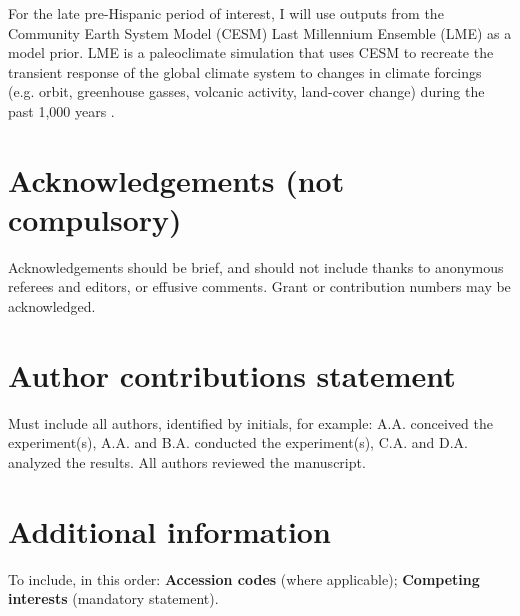 \documentclass[fleqn,10pt]{wlscirep}
\begin{document}
For the late pre-Hispanic period of interest, I will use outputs from the Community Earth System Model (CESM) Last Millennium Ensemble (LME) as a model prior. LME is a paleoclimate simulation that uses CESM to recreate the transient response of the global climate system to changes in climate forcings (e.g. orbit, greenhouse gasses, volcanic activity, land-cover change) during the past 1,000 years \cite{Otto-bliesner2015}.





\section*{Acknowledgements (not compulsory)}

Acknowledgements should be brief, and should not include thanks to anonymous referees and editors, or effusive comments. Grant or contribution numbers may be acknowledged.

\section*{Author contributions statement}

Must include all authors, identified by initials, for example:
A.A. conceived the experiment(s),  A.A. and B.A. conducted the experiment(s), C.A. and D.A. analyzed the results.  All authors reviewed the manuscript. 

\section*{Additional information}

To include, in this order: \textbf{Accession codes} (where applicable); \textbf{Competing interests} (mandatory statement). 
\end{document}
